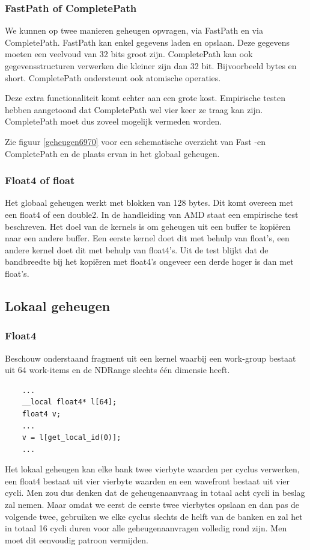 \subsubsection{FastPath of CompletePath}
We kunnen op twee manieren geheugen opvragen, via FastPath en via CompletePath. FastPath kan enkel gegevens laden en opslaan. Deze gegevens moeten een veelvoud van 32 bits groot zijn. CompletePath kan ook gegevensstructuren verwerken die kleiner zijn dan 32 bit. Bijvoorbeeld bytes en short. CompletePath ondersteunt ook atomische operaties.

Deze extra functionaliteit komt echter aan een grote kost. Empirische testen \cite[p.~6-3]{amd} hebben aangetoond dat CompletePath wel vier keer ze traag kan zijn. CompletePath moet dus zoveel mogelijk vermeden worden.

Zie figuur \ref{geheugen6970} voor een schematische overzicht van Fast -en CompletePath en de plaats ervan in het globaal geheugen.

\subsubsection{Float4 of float}
Het globaal geheugen werkt met blokken van 128 bytes. Dit komt overeen met een float4 of een double2. In de handleiding van AMD staat een empirische test beschreven. Het doel van de kernels is om geheugen uit een buffer te kopi\"eren naar een andere buffer. Een eerste kernel doet dit met behulp van float's, een andere kernel doet dit met behulp van float4's. Uit de test blijkt dat de bandbreedte bij het kopi\"eren met float4's ongeveer een derde hoger is dan met float's. \cite[p.~6-11]{amd}

\subsection{Lokaal geheugen}
\subsubsection{Float4}
\label{fl4BankConfl}
Beschouw onderstaand fragment uit een kernel waarbij een work-group bestaat uit 64 work-items en de NDRange slechts \'e\'en dimensie heeft.
\begin{lstlisting}
    ...
    __local float4* l[64];
    float4 v;
    ...
    v = l[get_local_id(0)];
    ...
\end{lstlisting}
Het lokaal geheugen kan elke bank twee vierbyte waarden per cyclus verwerken, een float4 bestaat uit vier vierbyte waarden en een wavefront bestaat uit vier cycli. Men zou dus denken dat de geheugenaanvraag in totaal acht cycli in beslag zal nemen. Maar omdat we eerst de eerste twee vierbytes opslaan en dan pas de volgende twee, gebruiken we elke cyclus slechts de helft van de banken en zal het in totaal 16 cycli duren voor alle geheugenaanvragen volledig rond zijn. Men moet dit eenvoudig patroon vermijden.

